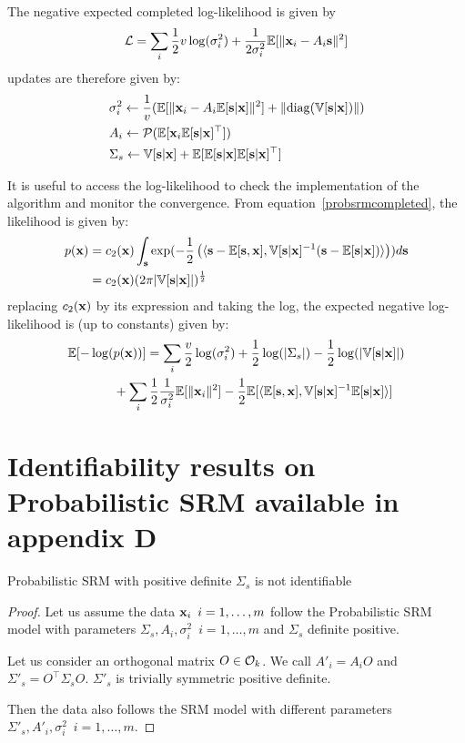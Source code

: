 \documentclass{article}
\begin{document}
The negative expected completed log-likelihood is given by
\begin{align}
	\mathcal{L} = \sum_i \frac12 v \log(\sigma_i^2) + \frac1{2 \sigma_i^2} \mathbb{E}[\| \mathbf{x}_i - A_i \mathbf{s} \|^2]
\end{align}
updates are therefore given by:
\begin{align}
  &\sigma_i^2 \leftarrow \frac1{v} (\mathbb{E}[\| \mathbf{x}_i - A_i \mathbb{E}[\mathbf{s}|\mathbf{x}]\|^2] + \| {\rm diag}(\mathbb{V}[\mathbf{s} | \mathbf{x}]) \|) \\
  &A_i \leftarrow \mathcal{P}(\mathbb{E}[\mathbf{x}_i \mathbb{E}[\mathbf{s}|\mathbf{x}]^{\top}]) \label{eq:psrm:Aiupdate} \\
  & \Sigma_s \leftarrow \mathbb{V}[\mathbf{s} | \mathbf{x}] + \mathbb{E}[\mathbb{E}[\mathbf{s} | \mathbf{x}] \mathbb{E}[\mathbf{s} | \mathbf{x}]^{\top}]
\end{align}

It is useful to access the log-likelihood to check the implementation of the
algorithm and monitor the convergence.
%
From equation~\eqref{probsrmcompleted},
the likelihood is given by:
\begin{align}
  p(\mathbf{x}) &= c_2(\mathbf{x}) \int_{\mathbf{s}} \exp(-\frac12 \left( \langle{  \mathbf{s}- \mathbb{E}[\mathbf{s}},{ \mathbf{x}], \mathbb{V}[\mathbf{s} | \mathbf{x}]^{-1} ( \mathbf{s} - \mathbb{E}[\mathbf{s} | \mathbf{x}])  }\rangle \right)) d\mathbf{s} \\
         &= c_2(\mathbf{x}) (2 \pi |\mathbb{V}[\mathbf{s} | \mathbf{x}]|)^{\frac12}
\end{align}
replacing $c_2(\mathbf{x})$ by its expression and taking the log, the expected negative
log-likelihood is (up to constants) given by:
\begin{align}
  \mathbb{E}[-\log(&p(\mathbf{x}))] = \sum_i \frac{v}{2} \log(\sigma_i^2) + \frac12 \log(|\Sigma_s|) - \frac12 \log(|\mathbb{V}[\mathbf{s} | \mathbf{x}]|) \nonumber \\ &+ \sum_i
  \frac12 \frac1{\sigma_i^2} \mathbb{E}[\|\mathbf{x}_i\|^2] - \frac12 \mathbb{E}[\langle{  \mathbb{E}[\mathbf{s}},{ \mathbf{x}], \mathbb{V}[\mathbf{s} | \mathbf{x}]^{-1} \mathbb{E}[\mathbf{s} | \mathbf{x}] }\rangle]
\end{align}


\section{Identifiability results on Probabilistic SRM available in~\cite{richard2020modeling} appendix D}
\label{app:unidentifiability}
\begin{proposition}
Probabilistic SRM with positive definite $\Sigma_s$ is not identifiable
\end{proposition}
\begin{proof}
Let us assume the data $\mathbf{x}_i \enspace i=1, \dots, m$ follow the Probabilistic SRM model with parameters $\Sigma_s, A_i, \sigma_i^2 \enspace i=1, \dots, m$ and $\Sigma_s$ definite positive.

Let us consider an orthogonal matrix $O \in \mathcal{O}_k$.
We call $A'_i = A_i O$ and $\Sigma'_s = O^{\top} \Sigma_s O$.
$\Sigma'_s$ is trivially symmetric positive definite.

Then the data also follows the SRM model with different parameters $\Sigma'_s, A'_i, \sigma_i^2 \enspace i=1, \dots, m$.
\end{proof}
\end{document}
